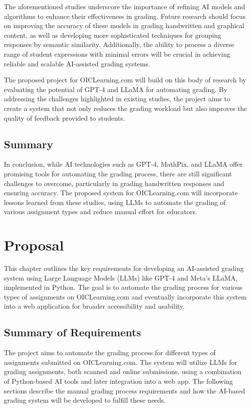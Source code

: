 \documentclass[ms,twoside,print]{nuthesis}
\begin{document}
The aforementioned studies underscore the importance of refining AI models and algorithms 
to enhance their effectiveness in grading. Future research should focus on improving the 
accuracy of these models in grading handwritten and graphical content, as well as 
developing more sophisticated techniques for grouping responses by semantic similarity. 
Additionally, the ability to process a diverse range of student expressions with minimal 
errors will be crucial in achieving reliable and scalable AI-assisted grading systems.

The proposed project for OICLearning.com will build on this body of research by evaluating the 
potential of GPT-4 and LLaMA for automating grading. By addressing the challenges highlighted in 
existing studies, the project aims to create a system that not only reduces the grading workload 
but also improves the quality of feedback provided to students.

\section{Summary}

In conclusion, while AI technologies such as GPT-4, MathPix, and LLaMA offer promising tools 
for automating the grading process, there are still significant challenges to overcome, 
particularly in grading handwritten responses and ensuring accuracy. The proposed system for 
OICLearning.com will incorporate lessons learned from these studies, using LLMs to automate the 
grading of various assignment types and reduce manual effort for educators.


\chapter{Proposal}

This chapter outlines the key requirements for developing an AI-assisted grading system 
using Large Language Models (LLMs) like GPT-4 and Meta's LLaMA, implemented in Python. 
The goal is to automate the grading process for various types of assignments on OICLearning.com 
and eventually incorporate this system into a web application for broader accessibility and usability.

\section{Summary of Requirements}

The project aims to automate the grading process for different types of assignments submitted on 
OICLearning.com. The system will utilize LLMs for grading assignments, both scanned and online 
submissions, using a combination of Python-based AI tools and later integration into a web app. The 
following sections describe the manual grading process requirements and how the AI-based grading 
system will be developed to fulfill these needs.
\end{document}
